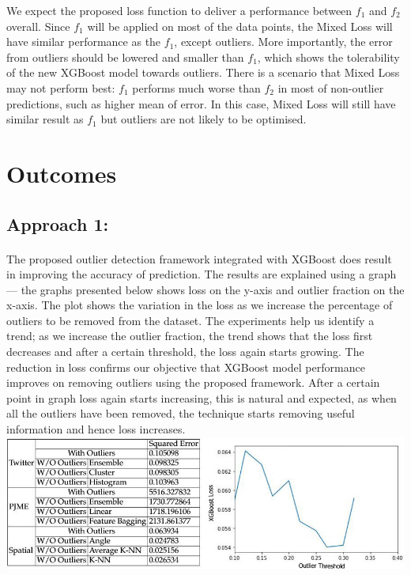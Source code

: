 \documentclass[runningheads]{llncs}
\begin{document}
We expect the proposed loss function to deliver a performance between $f_1$ and $f_2$ overall. Since $f_1$ will be applied on most of the data points, the Mixed Loss will have similar performance as the $f_1$, except outliers. More importantly, the error from outliers should be lowered and smaller than $f_1$, which shows the tolerability of the new XGBoost model towards outliers. There is a scenario that Mixed Loss may not perform best: $f_1$ performs much worse than $f_2$ in most of non-outlier predictions, such as higher mean of error. In this case, Mixed Loss will still have similar result as $f_1$ but outliers are not likely to be optimised.



\section{Outcomes}
\subsection{Approach 1:}


\paragraph{} The proposed outlier detection framework integrated with XGBoost does result in improving the accuracy of prediction. The results are explained using a graph — the graphs presented below shows loss on the y-axis and outlier fraction on the x-axis. The plot shows the variation in the loss as we increase the percentage of outliers to be removed from the dataset. The experiments help us identify a trend; as we increase the outlier fraction, the trend shows that the loss first decreases and after a certain threshold, the loss again starts growing. The reduction in loss confirms our objective that XGBoost model performance improves on removing outliers using the proposed framework. After a certain point in graph loss again starts increasing, this is natural and expected, as when all the outliers have been removed, the technique starts removing useful information and hence loss increases. \\

\includegraphics[scale=0.50]{result1.jpg}
\end{document}
